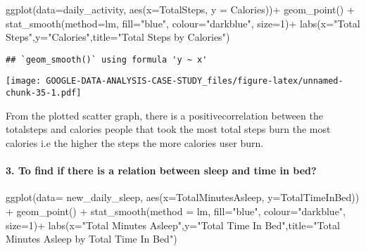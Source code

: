 \documentclass[
]{article}
\newenvironment{Shaded}{\begin{snugshade}}{\end{snugshade}}
\newcommand{\AttributeTok}[1]{\textcolor[rgb]{0.77,0.63,0.00}{#1}}
\newcommand{\DecValTok}[1]{\textcolor[rgb]{0.00,0.00,0.81}{#1}}
\newcommand{\FunctionTok}[1]{\textcolor[rgb]{0.00,0.00,0.00}{#1}}
\newcommand{\NormalTok}[1]{#1}
\newcommand{\SpecialCharTok}[1]{\textcolor[rgb]{0.00,0.00,0.00}{#1}}
\newcommand{\StringTok}[1]{\textcolor[rgb]{0.31,0.60,0.02}{#1}}
\begin{document}
\begin{Shaded}
\begin{Highlighting}[]
\FunctionTok{ggplot}\NormalTok{(}\AttributeTok{data=}\NormalTok{daily\_activity, }\FunctionTok{aes}\NormalTok{(}\AttributeTok{x=}\NormalTok{TotalSteps, }\AttributeTok{y =}\NormalTok{ Calories))}\SpecialCharTok{+} \FunctionTok{geom\_point}\NormalTok{() }\SpecialCharTok{+} \FunctionTok{stat\_smooth}\NormalTok{(}\AttributeTok{method=}\NormalTok{lm, }\AttributeTok{fill=}\StringTok{"blue"}\NormalTok{, }\AttributeTok{colour=}\StringTok{"darkblue"}\NormalTok{, }\AttributeTok{size=}\DecValTok{1}\NormalTok{)}\SpecialCharTok{+}
  \FunctionTok{labs}\NormalTok{(}\AttributeTok{x=}\StringTok{"Total Steps"}\NormalTok{,}\AttributeTok{y=}\StringTok{"Calories"}\NormalTok{,}\AttributeTok{title=}\StringTok{"Total Steps by Calories"}\NormalTok{)}
\end{Highlighting}
\end{Shaded}

\begin{verbatim}
## `geom_smooth()` using formula 'y ~ x'
\end{verbatim}

\texttt{[image: GOOGLE-DATA-ANALYSIS-CASE-STUDY\_files/figure-latex/unnamed-chunk-35-1.pdf]}

From the plotted scatter graph, there is a positivecorrelation between
the totalsteps and calories people that took the most total steps burn
the most calories i.e the higher the steps the more calories user burn.

\hypertarget{to-find-if-there-is-a-relation-between-sleep-and-time-in-bed}{%
\paragraph{3. To find if there is a relation between sleep and time in
bed?}\label{to-find-if-there-is-a-relation-between-sleep-and-time-in-bed}}

\begin{Shaded}
\begin{Highlighting}[]
\FunctionTok{ggplot}\NormalTok{(}\AttributeTok{data=}\NormalTok{ new\_daily\_sleep, }\FunctionTok{aes}\NormalTok{(}\AttributeTok{x=}\NormalTok{TotalMinutesAsleep, }\AttributeTok{y=}\NormalTok{TotalTimeInBed)) }\SpecialCharTok{+} \FunctionTok{geom\_point}\NormalTok{() }\SpecialCharTok{+} \FunctionTok{stat\_smooth}\NormalTok{(}\AttributeTok{method =}\NormalTok{ lm,  }\AttributeTok{fill=}\StringTok{"blue"}\NormalTok{, }\AttributeTok{colour=}\StringTok{"darkblue"}\NormalTok{, }\AttributeTok{size=}\DecValTok{1}\NormalTok{)}\SpecialCharTok{+}
  \FunctionTok{labs}\NormalTok{(}\AttributeTok{x=}\StringTok{"Total Minutes Asleep"}\NormalTok{,}\AttributeTok{y=}\StringTok{"Total Time In Bed"}\NormalTok{,}\AttributeTok{title=}\StringTok{"Total Minutes Asleep by Total Time In Bed"}\NormalTok{)}
\end{Highlighting}
\end{Shaded}
\end{document}
